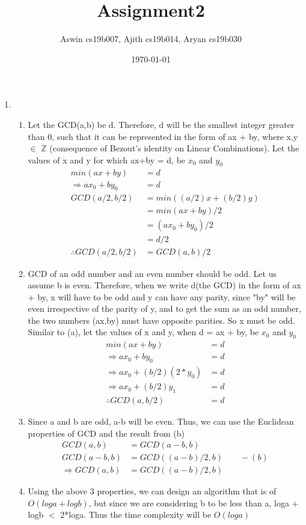 \documentclass[12pt]{article}
\title{Assignment2}
\author{Aswin cs19b007, Ajith cs19b014, Aryan cs19b030}
\date{\today}
\begin{document}
\maketitle

\newpage
\begin{enumerate}
    \item %
    \begin{enumerate}
        \item
        Let the GCD(a,b) be d. Therefore, d will be the smallest integer greater than 0, such that it can be represented in the form of ax + by, where x,y $\in$ $\mathbb{Z}$ (consequence of Bezout's identity on Linear Combinations). Let the values of x and y for which ax+by = d, be $x_0$ and $y_0$
        \begin{align*}
            min(ax+by) &= d \\
            \Rightarrow ax_0 + by_0 &= d\\
            GCD(a/2, b/2) &= min((a/2)x + (b/2)y) \\
            &= min(ax + by)/2 \\
            &= (ax_0 + by_0)/2 \\
            &= d/2 \\
            \therefore GCD(a/2,b/2) &= GCD(a,b)/2 
    \end{align*}
        \item
        GCD of an odd number and an even number should be odd. Let us assume b is even. Therefore, when we write d(the GCD) in the form of ax + by, x will have to be odd and y can have any parity, since "by" will be even irrespective of the parity of y, and to get the sum as an odd number, the two numbers (ax,by) must have opposite parities. So x must be odd. Similar to (a), let the values of x and y, when d = ax + by, be $x_0$ and $y_0$
        \begin{align*}
            min(ax+by) &= d\\
            \Rightarrow ax_0 + by_0 &= d\\
            \Rightarrow ax_0 + (b/2)(2*y_0) &= d\\
            \Rightarrow ax_0 + (b/2)y_1 &= d\\
            \therefore GCD(a,b/2) &= d
        \end{align*}
        \item
        Since a and b are odd, a-b will be even. Thus, we can use the Euclidean properties of GCD and the result from (b) 
        \begin{align*}
            GCD(a,b) &= GCD(a-b,b) \\
            GCD(a-b,b) &= GCD((a-b)/2,b) \qquad  -(b)\\
            \Rightarrow GCD(a,b) &= GCD((a-b)/2,b)
        \end{align*}
        \item
        Using the above 3 properties, we can design an algorithm that is of $O(log a + logb)$, but since we are considering b to be less than a, loga + logb $<$ 2*loga. Thus the time complexity will be $O(loga)$ 
        

\end{enumerate}
\end{enumerate}
\end{document}
